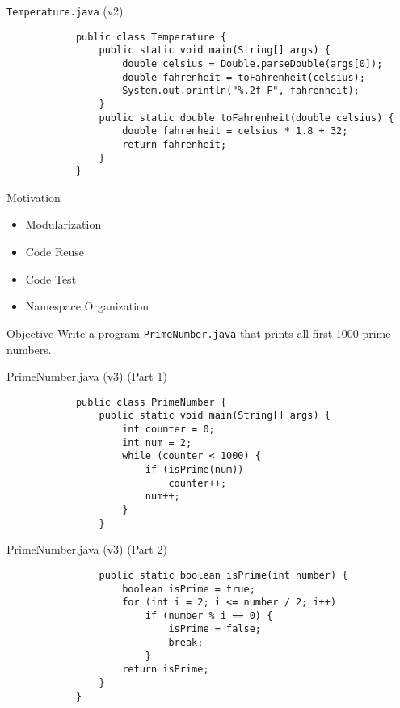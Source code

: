 \documentclass[10pt, compress]{beamer}
\begin{document}
\begin{slide}
	\begin{block}{\texttt{Temperature.java} (v2)}
		\begin{verbatim}
			public class Temperature {
			    public static void main(String[] args) {
			        double celsius = Double.parseDouble(args[0]);
			        double fahrenheit = toFahrenheit(celsius);
			        System.out.println("%.2f F", fahrenheit);
			    }
			    public static double toFahrenheit(double celsius) {
			        double fahrenheit = celsius * 1.8 + 32;
			        return fahrenheit;
			    }
			}
		\end{verbatim}
	\end{block}
\end{slide}

\begin{slide}
	\begin{block}{Motivation}
		\begin{itemize}
			\item[] Modularization
			\item[] Code Reuse
			\item[] Code Test
			\item[] Namespace Organization
		\end{itemize}
	\end{block}
\end{slide}

\begin{slide}
	\begin{block}{Objective}
		Write a program \texttt{PrimeNumber.java} that prints all first 1000 prime numbers.
	\end{block}
\end{slide}

\begin{slide}
	\begin{block}{PrimeNumber.java (v3) (Part 1)}
		\begin{verbatim}
			public class PrimeNumber {
			    public static void main(String[] args) {
			        int counter = 0;
			        int num = 2;
			        while (counter < 1000) {
			            if (isPrime(num))
			                counter++;
			            num++;
			        }
			    }
		\end{verbatim}
	\end{block}
\end{slide}

\begin{slide}
	\begin{block}{PrimeNumber.java (v3) (Part 2)}
		\begin{verbatim}
			    public static boolean isPrime(int number) {
			        boolean isPrime = true;
			        for (int i = 2; i <= number / 2; i++)
			            if (number % i == 0) {
			                isPrime = false;
			                break;
			            }
			        return isPrime;
			    }
			}
		\end{verbatim}
	\end{block}
\end{slide}
\end{document}

